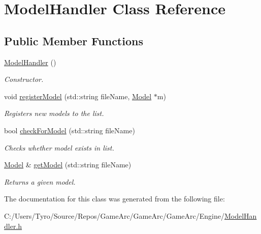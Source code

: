 \hypertarget{class_model_handler}{}\section{Model\+Handler Class Reference}
\label{class_model_handler}
\subsection*{Public Member Functions}
\begin{DoxyCompactItemize}
\item 
\mbox{\label{class_model_handler_a1eb33fd62e57a5115a2755090a533deb}} 
\mbox{\hyperlink{class_model_handler_a1eb33fd62e57a5115a2755090a533deb}{Model\+Handler}} ()
\begin{DoxyCompactList}\small\item\em Constructor. \end{DoxyCompactList}\item 
\mbox{\label{class_model_handler_ae2951e55741cc31e6490f5d98d3e84f5}} 
void \mbox{\hyperlink{class_model_handler_ae2951e55741cc31e6490f5d98d3e84f5}{register\+Model}} (std\+::string file\+Name, \mbox{\hyperlink{class_model}{Model}} $\ast$m)
\begin{DoxyCompactList}\small\item\em Registers new models to the list. \end{DoxyCompactList}\item 
\mbox{\label{class_model_handler_a935ceff894c06148839d8f6ae1b59272}} 
bool \mbox{\hyperlink{class_model_handler_a935ceff894c06148839d8f6ae1b59272}{check\+For\+Model}} (std\+::string file\+Name)
\begin{DoxyCompactList}\small\item\em Checks whether model exists in list. \end{DoxyCompactList}\item 
\mbox{\label{class_model_handler_a2a705ce466c536b85cdaccef1bd12990}} 
\mbox{\hyperlink{class_model}{Model}} \& \mbox{\hyperlink{class_model_handler_a2a705ce466c536b85cdaccef1bd12990}{get\+Model}} (std\+::string file\+Name)
\begin{DoxyCompactList}\small\item\em Returns a given model. \end{DoxyCompactList}\end{DoxyCompactItemize}


The documentation for this class was generated from the following file\+:\begin{DoxyCompactItemize}
\item 
C\+:/\+Users/\+Tyro/\+Source/\+Repos/\+Game\+Arc/\+Game\+Arc/\+Game\+Arc/\+Engine/\mbox{\hyperlink{_model_handler_8h}{Model\+Handler.\+h}}\end{DoxyCompactItemize}

